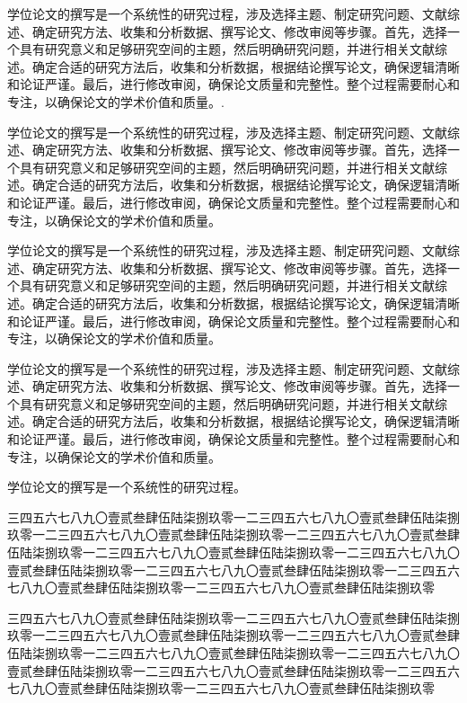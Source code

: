 \documentclass[master,academic]{ysuthesis} %
\begin{document}
		学位论文的撰写是一个系统性的研究过程，涉及选择主题、制定研究问题、文献综述、确定研究方法、收集和分析数据、撰写论文、修改审阅等步骤。首先，选择一个具有研究意义和足够研究空间的主题，然后明确研究问题，并进行相关文献综述。确定合适的研究方法后，收集和分析数据，根据结论撰写论文，确保逻辑清晰和论证严谨。最后，进行修改审阅，确保论文质量和完整性。整个过程需要耐心和专注，以确保论文的学术价值和质量。\cite{10900256}.

		学位论文的撰写是一个系统性的研究过程，涉及选择主题、制定研究问题、文献综述、确定研究方法、收集和分析数据、撰写论文、修改审阅等步骤。首先，选择一个具有研究意义和足够研究空间的主题，然后明确研究问题，并进行相关文献综述。确定合适的研究方法后，收集和分析数据，根据结论撰写论文，确保逻辑清晰和论证严谨。最后，进行修改审阅，确保论文质量和完整性。整个过程需要耐心和专注，以确保论文的学术价值和质量。

		学位论文的撰写是一个系统性的研究过程，涉及选择主题、制定研究问题、文献综述、确定研究方法、收集和分析数据、撰写论文、修改审阅等步骤。首先，选择一个具有研究意义和足够研究空间的主题，然后明确研究问题，并进行相关文献综述。确定合适的研究方法后，收集和分析数据，根据结论撰写论文，确保逻辑清晰和论证严谨。最后，进行修改审阅，确保论文质量和完整性。整个过程需要耐心和专注，以确保论文的学术价值和质量。

		学位论文的撰写是一个系统性的研究过程，涉及选择主题、制定研究问题、文献综述、确定研究方法、收集和分析数据、撰写论文、修改审阅等步骤。首先，选择一个具有研究意义和足够研究空间的主题，然后明确研究问题，并进行相关文献综述。确定合适的研究方法后，收集和分析数据，根据结论撰写论文，确保逻辑清晰和论证严谨。最后，进行修改审阅，确保论文质量和完整性。整个过程需要耐心和专注，以确保论文的学术价值和质量。

		学位论文的撰写是一个系统性的研究过程。

		三四五六七八九〇壹贰叁肆伍陆柒捌玖零一二三四五六七八九〇壹贰叁肆伍陆柒捌玖零一二三四五六七八九〇壹贰叁肆伍陆柒捌玖零一二三四五六七八九〇壹贰叁肆伍陆柒捌玖零一二三四五六七八九〇壹贰叁肆伍陆柒捌玖零一二三四五六七八九〇壹贰叁肆伍陆柒捌玖零一二三四五六七八九〇壹贰叁肆伍陆柒捌玖零一二三四五六七八九〇壹贰叁肆伍陆柒捌玖零一二三四五六七八九〇壹贰叁肆伍陆柒捌玖零

		三四五六七八九〇壹贰叁肆伍陆柒捌玖零一二三四五六七八九〇壹贰叁肆伍陆柒捌玖零一二三四五六七八九〇壹贰叁肆伍陆柒捌玖零一二三四五六七八九〇壹贰叁肆伍陆柒捌玖零一二三四五六七八九〇壹贰叁肆伍陆柒捌玖零一二三四五六七八九〇壹贰叁肆伍陆柒捌玖零一二三四五六七八九〇壹贰叁肆伍陆柒捌玖零一二三四五六七八九〇壹贰叁肆伍陆柒捌玖零一二三四五六七八九〇壹贰叁肆伍陆柒捌玖零
\end{document}
